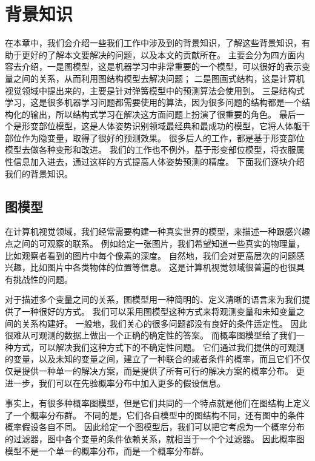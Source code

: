
\chapter{背景知识}
\label{chap:back}
在本章中，我们会介绍一些我们工作中涉及到的背景知识，了解这些背景知识，有助于更好的了解本文要解决的问题，以及本文的贡献所在。
主要会分为四方面内容去介绍，一是图模型，这是机器学习中非常重要的一个模型，可以很好的表示变量之间的关系，从而利用图结构模型去解决问题；
二是图画式结构，这是计算机视觉领域中提出来的，主要是针对弹簧模型中的预测算法会使用到。
三是结构式学习，这是很多机器学习问题都需要使用的算法，因为很多问题的结构都是一个结构化的输出，所以结构式学习在解决这方面问题上扮演了很重要的角色。
最后一个是形变部位模型，这是人体姿势识别领域最经典和最成功的模型，它将人体躯干部位作为隐变量，取得了很好的预测效果。
很多后人的工作，都是基于形变部位模型去做各种变形和改进。
我们的工作也不例外，基于形变部位模型，将衣服属性信息加入进去，通过这样的方式提高人体姿势预测的精度。
下面我们逐块介绍我们的背景知识。

\section{图模型}
在计算机视觉领域，我们经常需要构建一种真实世界的模型，来描述一种跟感兴趣点之间的可观察的联系。
例如给定一张图片，我们希望知道一些真实的物理量，比如观察者看到的图片中每个像素的深度。
自然地，我们会对更高层次的问题感兴趣，比如图片中各类物体的位置等信息。
这是计算机视觉领域很普遍的也很具有挑战性的问题。

对于描述多个变量之间的关系，图模型用一种简明的、定义清晰的语言来为我们提供了一种很好的方式。
我们可以采用图模型这种方式来将观测变量和未知变量之间的关系构建好。
一般地，我们关心的很多问题都没有良好的条件适定性。
因此很难从可观测的数据上做出一个正确的确定性的答案。
而概率图模型给了我们一种方式，可以解决我们这种方式下的不确定性问题。
它们通过我们提供的可观测的变量，以及未知的变量之间，建立了一种联合的或者条件的概率，而且它们不仅仅是提供一种单一的解决方案，而是提供了所有可行的解决方案的概率分布。
更进一步，我们可以在先验概率分布中加入更多的假设信息。

事实上，有很多种概率图模型，但是它们共同的一个特点就是他们在图结构上定义了一个概率分布群。
不同的是，它们各自模型中的图结构不同，还有图中的条件概率假设各自不同。
因此给定一个图模型后，我们可以把它考虑为一个概率分布的过滤器，图中各个变量的条件依赖关系，就相当于一个个过滤器。
因此概率图模型不是一个单一的概率分布，而是一个概率分布群。


